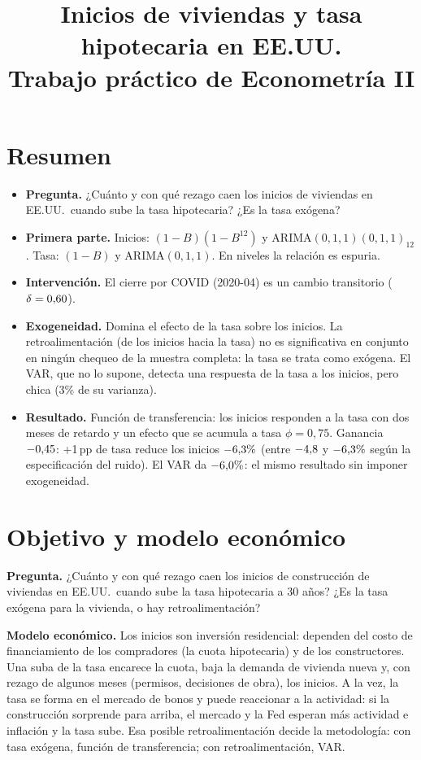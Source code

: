 \documentclass[11pt,a4paper]{article}
\title{\textbf{Inicios de viviendas y tasa hipotecaria en EE.UU.}\\[3pt]
\large Trabajo pr\'actico de Econometr\'ia II}
\author{}
\date{}
\begin{document}
\sloppy
\maketitle

\section*{Resumen}
\begin{itemize}
\item \textbf{Pregunta.} ¿Cu\'anto y con qu\'e rezago caen los inicios de viviendas en EE.UU.\ cuando sube la tasa hipotecaria? ¿Es la tasa ex\'ogena?
\item \textbf{Primera parte.} Inicios: $(1-B)(1-B^{12})$ y ARIMA$(0,1,1)(0,1,1)_{12}$. Tasa: $(1-B)$ y ARIMA$(0,1,1)$. En niveles la relaci\'on es espuria.
\item \textbf{Intervenci\'on.} El cierre por COVID (2020-04) es un cambio transitorio ($\delta=0{,}60$).
\item \textbf{Exogeneidad.} Domina el efecto de la tasa sobre los inicios. La retroalimentaci\'on (de los inicios hacia la tasa) no es significativa en conjunto en ning\'un chequeo de la muestra completa: la tasa se trata como ex\'ogena. El VAR, que no lo supone, detecta una respuesta de la tasa a los inicios, pero chica (3\% de su varianza).
\item \textbf{Resultado.} Funci\'on de transferencia: los inicios responden a la tasa con dos meses de retardo y un efecto que se acumula a tasa $\phi=0{,}75$. Ganancia $-0{,}45$: +1\,pp de tasa reduce los inicios $-6{,}3\%$ (entre $-4{,}8$ y $-6{,}3\%$ seg\'un la especificaci\'on del ruido). El VAR da $-6{,}0\%$: el mismo resultado sin imponer exogeneidad.
\end{itemize}

\section{Objetivo y modelo econ\'omico}
\textbf{Pregunta.} ¿Cu\'anto y con qu\'e rezago caen los inicios de construcci\'on de viviendas en EE.UU.\ cuando sube la tasa hipotecaria a 30 a\~nos? ¿Es la tasa ex\'ogena para la vivienda, o hay retroalimentaci\'on?

\textbf{Modelo econ\'omico.} Los inicios son inversi\'on residencial: dependen del costo de financiamiento de los compradores (la cuota hipotecaria) y de los constructores. Una suba de la tasa encarece la cuota, baja la demanda de vivienda nueva y, con rezago de algunos meses (permisos, decisiones de obra), los inicios. A la vez, la tasa se forma en el mercado de bonos y puede reaccionar a la actividad: si la construcci\'on sorprende para arriba, el mercado y la Fed esperan m\'as actividad e inflaci\'on y la tasa sube. Esa posible retroalimentaci\'on decide la metodolog\'ia: con tasa ex\'ogena, funci\'on de transferencia; con retroalimentaci\'on, VAR.
\end{document}

